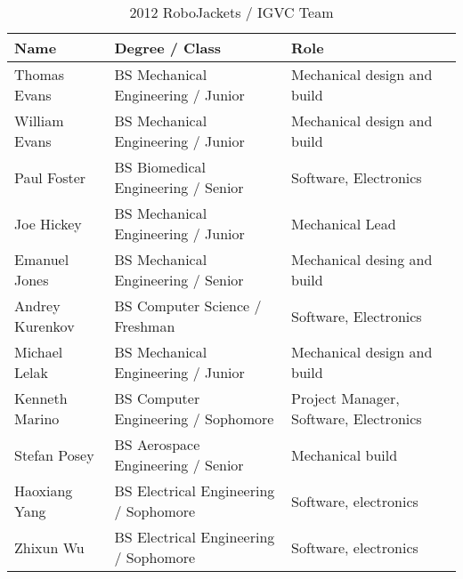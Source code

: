 \begin{table}[H]
\begin{center}
\caption{2012 RoboJackets / IGVC Team}
\begin{tabular}{| l | p{2.4in} | p{2in} |}
\hline
Name & Degree / Class & Role\\ \hline
Thomas Evans &		BS Mechanical Engineering / Junior& Mechanical design and build\\ \hline
William Evans &		BS Mechanical Engineering / Junior& Mechanical design and build\\ \hline
Paul Foster &		BS Biomedical Engineering / Senior& Software, Electronics\\ \hline
Joe Hickey &		BS Mechanical Engineering / Junior&	Mechanical Lead\\ \hline
Emanuel Jones &		BS Mechanical Engineering / Senior& Mechanical desing and build\\ \hline
Andrey Kurenkov &	BS Computer Science / Freshman & Software, Electronics\\ \hline
Michael Lelak &		BS Mechanical Engineering / Junior& Mechanical design and build\\ \hline
Kenneth Marino &	BS Computer Engineering / Sophomore&	Project Manager, Software, Electronics\\ \hline
Stefan Posey &		BS Aerospace Engineering / Senior &		Mechanical build\\ \hline
Haoxiang Yang &		BS Electrical Engineering / Sophomore & Software, electronics\\ \hline
Zhixun Wu &			BS Electrical Engineering / Sophomore &	Software, electronics\\ \hline 



\end{tabular}
\label{TAB:RJTeam}
\end{center}
\end{table}

